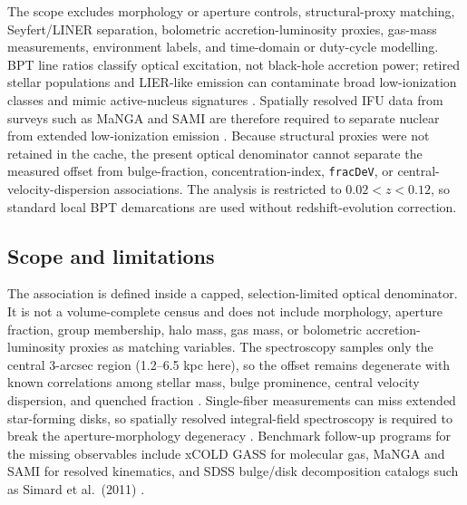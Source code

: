 \documentclass[twocolumn]{aastex631}
\begin{document}
The scope excludes morphology or aperture controls, structural-proxy matching, Seyfert/LINER separation, bolometric accretion-luminosity proxies, gas-mass measurements, environment labels, and time-domain or duty-cycle modelling. BPT line ratios classify optical excitation, not black-hole accretion power; retired stellar populations and LIER-like emission can contaminate broad low-ionization classes and mimic active-nucleus signatures \citep{cidfernandes2011,singh2013,stasinska2008,stasinska2015,belfiore2016}. Spatially resolved IFU data from surveys such as MaNGA and SAMI are therefore required to separate nuclear from extended low-ionization emission \citep{bundy2015,croom2012,belfiore2016}. Because structural proxies were not retained in the cache, the present optical denominator cannot separate the measured offset from bulge-fraction, concentration-index, \texttt{fracDeV}, or central-velocity-dispersion associations. The analysis is restricted to $0.02<z<0.12$, so standard local BPT demarcations are used without redshift-evolution correction.

\subsection{Scope and limitations}
The association is defined inside a capped, selection-limited optical denominator. It is not a volume-complete census and does not include morphology, aperture fraction, group membership, halo mass, gas mass, or bolometric accretion-luminosity proxies as matching variables. The spectroscopy samples only the central 3-arcsec region (1.2--6.5 kpc here), so the offset remains degenerate with known correlations among stellar mass, bulge prominence, central velocity dispersion, and quenched fraction \citep{schawinski2010,bluck2014,piotrowska2022}. Single-fiber measurements can miss extended star-forming disks, so spatially resolved integral-field spectroscopy is required to break the aperture-morphology degeneracy \citep{penny2018,cheung2016,bundy2015,canodiaz2016}. Benchmark follow-up programs for the missing observables include xCOLD GASS for molecular gas, MaNGA and SAMI for resolved kinematics, and SDSS bulge/disk decomposition catalogs such as Simard et al.\ (2011) \citep{xcoldgass2017,bundy2015,croom2012,simard2011}.
\end{document}
